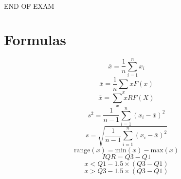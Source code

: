 \documentclass[
]{article}
\begin{document}
\newpage

END OF EXAM \newpage

\section{Formulas}

\[\bar{x} = \frac{1}{n} \sum_{i=1}^n x_i\]
\[\bar{x} = \frac{1}{n}\sum_{x} xF(x)\] \[\bar{x} = \sum_{x} xRF(X)\]
\[s^2 = \frac{1}{n-1}\sum_{i=1}^n (x_i - \bar{x})^2\]
\[s = \sqrt{\frac{1}{n-1}\sum_{i=1}^n (x_i - \bar{x})^2}\]
\[ \text{range}(x) = \text{min}(x) - \text{max}(x)\] \[IQR = Q3 - Q1 \]
\[x < Q1 - 1.5 \times (Q3 - Q1)\] \[x > Q3 - 1.5\times(Q3-Q1)\]
\end{document}
